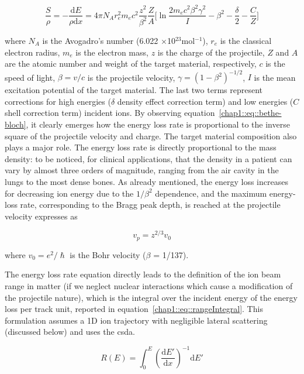 \begin{equation}
\frac{S}{\rho} = -\frac{\mathrm{d}E}{\rho \mathrm{d}x} = 4\pi N_{A}r^{2}_{e}m_{e}c^{2}\frac{z^{2}}{\beta^{2}}\frac{Z}{A}\bigg[\ln{\frac{2m_{e}c^{2}\beta^{2}\gamma^{2}}{I}}-\beta^{2}-\frac{\delta}{2}-\frac{C}{Z}\bigg]
\label{chap1::eq::bethe-bloch}
\end{equation}

where $N_{A}$ is the Avogadro's number (6.022 $\times$10$^{23}$mol$^{-1}$), $r_{e}$ is the classical electron radius, $m_{e}$ is the electron mass, $z$ is the charge of the projectile, $Z$ and $A$ are the atomic number and weight of the target material, respectively, $c$ is the speed of light, $\beta = v/c$ is the projectile velocity, $\gamma = (1-\beta^{2})^{-1/2}$, $I$ is the mean excitation potential of the target material. The last two terms represent corrections for high energies ($\delta$ density effect correction term) and low energies ($C$ shell correction term) incident ions. By observing equation~\ref{chap1::eq::bethe-bloch}, it clearly emerges how the energy loss rate is proportional to the inverse square of the projectile velocity and charge. The target material composition also plays a major role. The energy loss rate is directly proportional to the mass density: to be noticed, for clinical applications, that the density in a patient can vary by almost three orders of magnitude, ranging from the air cavity in the lungs to the most dense bones. 
As already mentioned, the energy loss increases for decreasing ion energy due to the $1/\beta^{2}$ dependence, and the maximum energy-loss rate, corresponding to the Bragg peak depth, is reached at the projectile velocity expresses as

\begin{equation}
v_p = z^{2/3}v_{0}
\label{chap1::eq::maxEloss}
\end{equation}

where $v_{0} = e^2/\hslash$ is the Bohr velocity ($\beta$ = 1/137).

The energy loss rate equation directly leads to the definition of the ion beam range in matter (if we neglect nuclear interactions which cause a modification of the projectile nature), which is the integral over the incident energy of the energy loss per track unit, reported in equation~\ref{chap1::eq::rangeIntegral}. This formulation assumes a 1D ion trajectory with negligible lateral scattering (discussed below) and uses the \gls{csda}. 

\begin{equation}
R(E) = \int_{0}^{E}(\frac{\mathrm{d}E'}{\mathrm{d}x})^{-1}\mathrm{d}E' 
\label{chap1::eq::rangeIntegral}
\end{equation}

